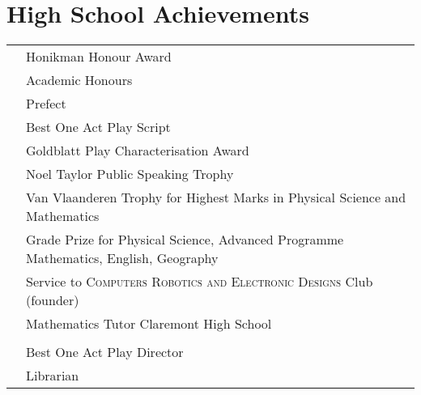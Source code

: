 \section{High School Achievements}
\begin{tabular}{R{2.5cm}|l}
 & Honikman Honour Award\\
         & Academic Honours\\
         & Prefect\\
         & Best One Act Play Script\\
         & Goldblatt Play Characterisation Award\\
         & Noel Taylor Public Speaking Trophy\\
         & Van Vlaanderen Trophy for Highest Marks in Physical Science and Mathematics\\
         & Grade Prize for Physical Science, Advanced Programme Mathematics, English, Geography\\
         & Service to \textsc{Computers Robotics and Electronic Designs} Club (founder)\\
         & Mathematics Tutor Claremont High School\\
         & \\
 & Best One Act Play Director\\
         & Librarian\\

\end{tabular}

